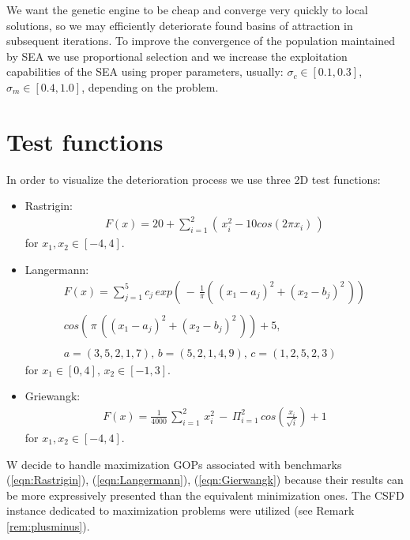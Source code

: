 We want the genetic engine to be cheap and converge very quickly to local
solutions, so we may efficiently deteriorate found basins of attraction in 
subsequent iterations. To improve the convergence of the population maintained
by SEA we use proportional selection 
and we increase the
exploitation capabilities of the SEA using proper parameters, usually:
$\sigma_c \in [0.1, 0.3]$, $\sigma_m \in [0.4, 1.0]$, depending on the problem.


\section{Test functions}
\label{sec:testFun}
In order to visualize the deterioration process we use 
three 2D test functions:
\begin{itemize}
  \item Rastrigin: 
  \begin{equation}
  \label{eqn:Rastrigin}
  \begin{array}{c}
  F(x)= 20 + \sum_{i=1}^2 (\, x_i^2 - 10 cos(2 \pi x_i) \, )
  \end{array}
  \end{equation}
  for $x_1, x_2 \in [-4, 4]$.
  \item Langermann:
  \begin{equation}
  \label{eqn:Langermann}
  \begin{array}{c}
  F(x) = \sum_{j=1}^5 c_j \,
  exp(\, - \, \frac{1}{\pi}
  ( \, (x_1 - a_j)^2 + (x_2 - b_j)^2 \, ))\\ 
  \\
  cos(\, \pi \, ((x_1 - a_j)^2 + (x_2 - b_j)^2 \, )) + 5,\\ 
  \\ 
  a = (3,5,2,1,7), \, b = (5,2,1,4,9), \, c = (1,2,5,2,3)
  \end{array}
  \end{equation}
  for $x_1 \in [0, 4], \, x_2 \in [-1, 3]$.
  \item Griewangk:
  \begin{equation}
  \label{eqn:Gierwangk}
  \begin{array}{c}
  F(x)=\frac{1}{4000} \, \sum_{i=1}^2 \, x_i^2 \, - \, \Pi_{i=1}^2
  \, cos \left( \frac{x_i}{\sqrt{i}} \right) + 1
  \end{array}
  \end{equation}
  for $x_1, x_2 \in [-4, 4]$.
\end{itemize}

W decide to handle maximization GOPs associated with benchmarks
(\ref{eqn:Rastrigin}), (\ref{eqn:Langermann}), (\ref{eqn:Gierwangk}) 
because their results can be more
expressively presented than the equivalent minimization ones. 
The CSFD instance dedicated to maximization problems
were utilized (see Remark \ref{rem:plusminus}).


